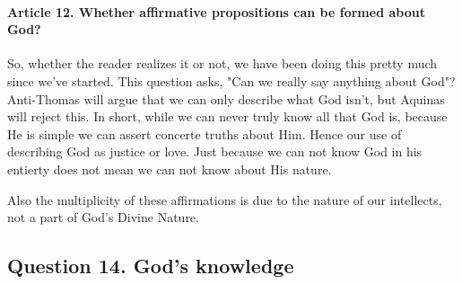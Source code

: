 \documentclass{ucetd}
\begin{document}
\paragraph{Article 12. Whether affirmative propositions can be formed about God?}
So, whether the reader realizes it or not, we have been doing this pretty much since we've started. This question asks, "Can we really say anything about God"? Anti-Thomas will argue that we can only describe what God isn't, but Aquinas will reject this. In short, while we can never truly know all that God is, because He is simple we can assert concerte truths about Him. Hence our use of describing God as justice or love. Just because we can not know God in his entierty does not mean we can not know about His nature.

Also the multiplicity of these affirmations is due to the nature of our intellects, not a part of God's Divine Nature.


\subsection{Question 14. God's knowledge}
\end{document}
